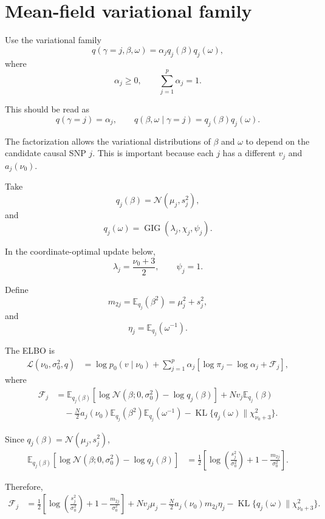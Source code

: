 \documentclass[11pt]{article}
\newcommand{\nuo}{\nu_0}
\newcommand{\sigb}{\sigma_0^2}
\newcommand{\E}{\mathbb E}
\newcommand{\KL}{\operatorname{KL}}
\newcommand{\Normal}{\mathcal N}
\newcommand{\GIG}{\operatorname{GIG}}
\newcommand{\chisq}{\chi^2}
\begin{document}
\section{Mean-field variational family}

Use the variational family
\[
q(\gamma=j,\beta,\omega)
=
\alpha_j q_j(\beta)q_j(\omega),
\]
where
\[
\alpha_j\geq 0,
\qquad
\sum_{j=1}^p \alpha_j=1.
\]

This should be read as
\[
q(\gamma=j)=\alpha_j,
\qquad
q(\beta,\omega\mid \gamma=j)=q_j(\beta)q_j(\omega).
\]

The factorization allows the variational distributions of \(\beta\) and \(\omega\) to depend on the candidate causal SNP \(j\). This is important because each \(j\) has a different \(v_j\) and \(a_j(\nuo)\).

Take
\[
q_j(\beta)=\Normal(\mu_j,s_j^2),
\]
and
\[
q_j(\omega)
=
\GIG(\lambda_j,\chi_j,\psi_j).
\]

In the coordinate-optimal update below,
\[
\lambda_j=\frac{\nuo+3}{2},
\qquad
\psi_j=1.
\]

Define
\[
m_{2j}
=
\E_{q_j}(\beta^2)
=
\mu_j^2+s_j^2,
\]
and
\[
\eta_j
=
\E_{q_j}(\omega^{-1}).
\]

The ELBO is
\begin{align}
\mathcal L(\nuo,\sigb,q)
&=
\log p_0(v\mid\nuo)
+
\sum_{j=1}^p
\alpha_j
\left[
\log \pi_j
-\log \alpha_j
+
\mathcal F_j
\right],
\label{eq:global_elbo}
\end{align}
where
\begin{align}
\mathcal F_j
&=
\E_{q_j(\beta)}
\left[
\log \Normal(\beta;0,\sigb)
-
\log q_j(\beta)
\right]
+
Nv_j\E_{q_j}(\beta)
\nonumber\\
&\quad
-
\frac N2
a_j(\nuo)
\E_{q_j}(\beta^2)
\E_{q_j}(\omega^{-1})
-
\KL\{q_j(\omega)\|\chisq_{\nuo+3}\}.
\label{eq:Fj_general}
\end{align}

Since \(q_j(\beta)=\Normal(\mu_j,s_j^2)\),
\begin{align}
\E_{q_j(\beta)}
\left[
\log \Normal(\beta;0,\sigb)
-
\log q_j(\beta)
\right]
&=
\frac12
\left[
\log\left(\frac{s_j^2}{\sigb}\right)
+
1
-
\frac{m_{2j}}{\sigb}
\right].
\end{align}

Therefore,
\begin{align}
\mathcal F_j
&=
\frac12
\left[
\log\left(\frac{s_j^2}{\sigb}\right)
+
1
-
\frac{m_{2j}}{\sigb}
\right]
+
Nv_j\mu_j
-
\frac N2 a_j(\nuo)m_{2j}\eta_j
-
\KL\{q_j(\omega)\|\chisq_{\nuo+3}\}.
\label{eq:Fj_normal}
\end{align}
\end{document}
